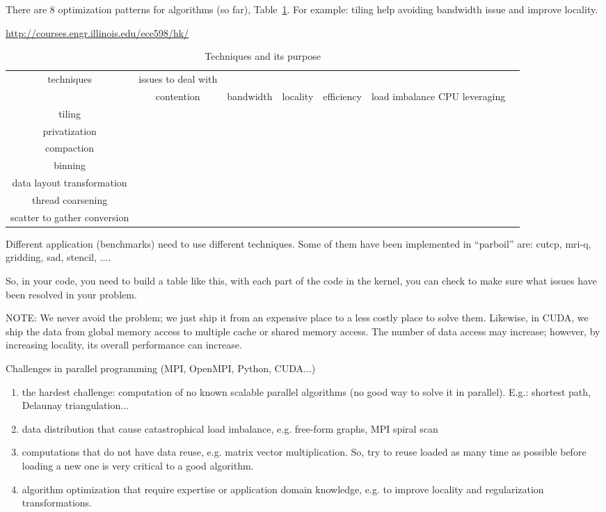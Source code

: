 There are 8 optimization patterns for algorithms (so far),
Table~\ref{tab:Opt-technique_CUDA}. For example: tiling help avoiding
bandwidth issue and improve locality.

\url{http://courses.engr.illinois.edu/ece598/hk/}

\begin{table}[hbt]
\begin{center}
\caption{Techniques and its purpose}
\begin{tabular}{ccccccc} 
\hline
techniques & issues to deal with \\ 
& contention & bandwidth & locality & efficiency & load imbalance CPU
leveraging \\
tiling \\
privatization\\
compaction \\
binning\\
data layout transformation\\
thread coarsening \\
scatter to gather conversion \\
\hline\hline
\end{tabular}
\end{center}
\label{tab:Opt-technique_CUDA}
\end{table}

Different application (benchmarks) need to use different
techniques. Some of them have been implemented in ``parboil'' are:
cutcp, mri-q, gridding, sad, stencil, ....

So, in your code, you need to build a table like this, with each part
of the code in the kernel, you can check to make sure what issues have
been resolved in your problem.

\begin{framed}
  NOTE: We never avoid the problem; we just ship it from an expensive
  place to a less costly place to solve them. Likewise, in CUDA, we ship
  the data from global memory access to multiple cache or shared memory
  access. The number of data access may increase; however, by increasing
  locality, its overall performance can increase. 
\end{framed}

Challenges in parallel programming (MPI, OpenMPI, Python, CUDA...)
\begin{enumerate}
\item the hardest challenge: computation of no known scalable parallel
  algorithms (no good way to solve it in parallel). E.g.: shortest
  path, Delaunay triangulation...
\item data distribution that cause catastrophical load imbalance,
  e.g. free-form graphs, MPI spiral scan
\item computations that do not have data reuse, e.g. matrix vector
  multiplication. So, try to reuse loaded as many time as possible
  before loading a new one is very critical to a good algorithm.
\item algorithm optimization that require expertise or application
  domain knowledge, e.g. to improve locality and regularization
  transformations. 
\end{enumerate}


